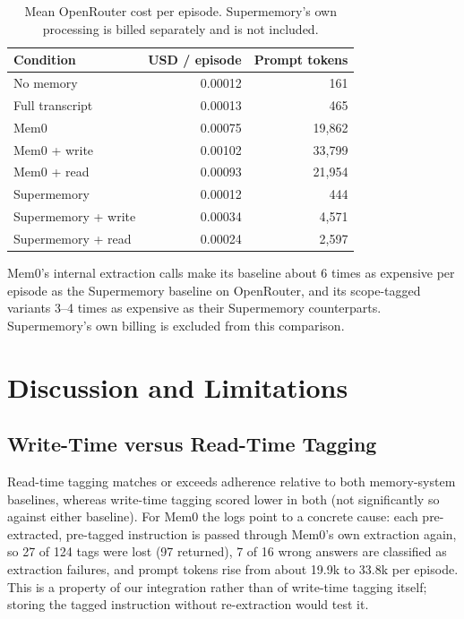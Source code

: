 \documentclass[11pt,a4paper]{article}
\begin{document}
\begin{table}[htbp]
\centering
\small
\caption{Mean OpenRouter cost per episode. Supermemory's own
processing is billed separately and is not included.}
\label{tab:cost}
\begin{tabular}{lrr}
\toprule
Condition & USD / episode & Prompt tokens \\
\midrule
No memory & 0.00012 & 161 \\
Full transcript & 0.00013 & 465 \\
Mem0 & 0.00075 & 19,862 \\
Mem0 + write & 0.00102 & 33,799 \\
Mem0 + read & 0.00093 & 21,954 \\
Supermemory & 0.00012 & 444 \\
Supermemory + write & 0.00034 & 4,571 \\
Supermemory + read & 0.00024 & 2,597 \\
\bottomrule
\end{tabular}
\end{table}

Mem0's internal extraction calls make its baseline about 6
times as expensive per episode as the Supermemory baseline on
OpenRouter, and its scope-tagged variants 3--4 times as
expensive as their Supermemory counterparts. Supermemory's own
billing is excluded from this comparison.

\section{Discussion and Limitations}

\subsection{Write-Time versus Read-Time Tagging}

Read-time tagging matches or exceeds adherence
relative to both memory-system baselines, whereas
write-time tagging scored lower in both (not
significantly so against either baseline). For
Mem0 the logs point to a concrete cause: each
pre-extracted, pre-tagged instruction is passed
through Mem0's own extraction again, so 27 of 124
tags were lost (97 returned), 7 of 16 wrong answers
are classified as extraction failures, and prompt
tokens rise from about 19.9k to 33.8k per episode.
This is a property of our integration rather than
of write-time tagging itself; storing the tagged
instruction without re-extraction would test it.
\end{document}
